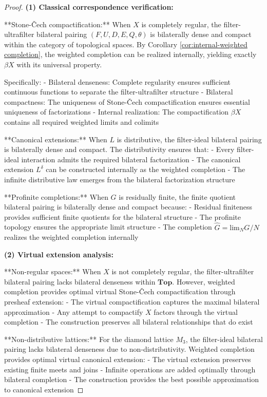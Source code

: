 \documentclass[11pt]{article}
\theoremstyle{plain}
\theoremstyle{definition}
\theoremstyle{remark}
\renewcommand{\lim}{\mathrm{lim}}
\newcommand{\wh}[1]{\widehat{#1}}
\begin{document}
\begin{proof}
\textbf{(1) Classical correspondence verification:}

**Stone-\v{C}ech compactification:** When $X$ is completely regular, the filter-ultrafilter bilateral pairing $(F, U, D, E, Q, \theta)$ is bilaterally dense and compact within the category of topological spaces. By Corollary \ref{cor:internal-weighted completion}, the weighted completion can be realized internally, yielding exactly $\beta X$ with its universal property.

Specifically:
- Bilateral denseness: Complete regularity ensures sufficient continuous functions to separate the filter-ultrafilter structure
- Bilateral compactness: The uniqueness of Stone-\v{C}ech compactification ensures essential uniqueness of factorizations
- Internal realization: The compactification $\beta X$ contains all required weighted limits and colimits

**Canonical extensions:** When $L$ is distributive, the filter-ideal bilateral pairing is bilaterally dense and compact. The distributivity ensures that:
- Every filter-ideal interaction admits the required bilateral factorization
- The canonical extension $L^{\delta}$ can be constructed internally as the weighted completion
- The infinite distributive law emerges from the bilateral factorization structure

**Profinite completions:** When $G$ is residually finite, the finite quotient bilateral pairing is bilaterally dense and compact because:
- Residual finiteness provides sufficient finite quotients for the bilateral structure
- The profinite topology ensures the appropriate limit structure
- The completion $\wh{G} = \lim_{N} G/N$ realizes the weighted completion internally

\textbf{(2) Virtual extension analysis:}

**Non-regular spaces:** When $X$ is not completely regular, the filter-ultrafilter bilateral pairing lacks bilateral denseness within $\mathbf{Top}$. However, weighted completion provides optimal virtual Stone-\v{C}ech compactification through presheaf extension:
- The virtual compactification captures the maximal bilateral approximation
- Any attempt to compactify $X$ factors through the virtual completion
- The construction preserves all bilateral relationships that do exist

**Non-distributive lattices:** For the diamond lattice $M_3$, the filter-ideal bilateral pairing lacks bilateral denseness due to non-distributivity. Weighted completion provides optimal virtual canonical extension:
- The virtual extension preserves existing finite meets and joins
- Infinite operations are added optimally through bilateral completion
- The construction provides the best possible approximation to canonical extension


\end{proof}
\end{document}

